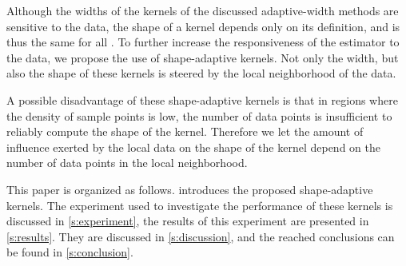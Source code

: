 	Although the widths of the kernels of the discussed adaptive-width methods are sensitive to the data, the shape of a kernel depends only on its definition, and is thus the same for all \varPattern[\itXis]. To further increase the responsiveness of the estimator to the data, we propose the use of shape-adaptive kernels. Not only the width, but also the shape of these kernels is steered by the local neighborhood of the data.

	A possible disadvantage of these shape-adaptive kernels is that in regions where the density of sample points is low, the number of data points is insufficient to reliably compute the shape of the kernel. Therefore we let the amount of influence exerted by the local data on the shape of the kernel depend on the number of data points in the local neighborhood.

	This paper is organized as follows.  introduces the proposed shape-adaptive kernels. The experiment used to investigate the performance of these kernels is discussed in \cref{s:experiment}, the results of this experiment are presented in \cref{s:results}. They are discussed in \cref{s:discussion}, and the reached conclusions can be found in \cref{s:conclusion}.